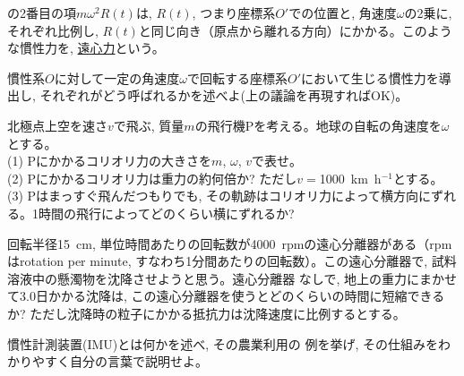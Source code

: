 の2番目の項$m\omega^2 R(t)$は, $R(t)$, つまり座標系$O'$での位置と, 角速度$\omega$の2乗に, 
それぞれ比例し, $R(t)$と同じ向き（原点から離れる方向）にかかる。このような慣性力を, 
\underline{遠心力}という。
\vspace{0.2cm}

\begin{q}\label{q:inert_frame_rot_0}
慣性系$O$に対して一定の角速度$\omega$で回転する座標系$O'$において生じる慣性力を導出し, 
それぞれがどう呼ばれるかを述べよ(上の議論を再現すればOK)。
\end{q}

\begin{q}\label{q:inert_frame_rot}
北極点上空を速さ$v$で飛ぶ, 質量$m$の飛行機Pを考える。地球の自転の角速度を$\omega$とする。\\
(1) Pにかかるコリオリ力の大きさを$m$, $\omega$, $v$で表せ。\\
(2) Pにかかるコリオリ力は重力の約何倍か? ただし$v=$1000~km~h$^{-1}$とする。\\
(3) Pはまっすぐ飛んだつもりでも, その軌跡はコリオリ力によって横方向にずれる。1時間の飛行によってどのくらい横にずれるか?
\end{q}

\begin{q}\label{q:centrifuge}
回転半径15~cm, 単位時間あたりの回転数が4000~rpmの遠心分離器がある（rpmはrotation per minute, 
すなわち1分間あたりの回転数）。この遠心分離器で, 試料溶液中の懸濁物を沈降させようと思う。遠心分離器
なしで, 地上の重力にまかせて3.0日かかる沈降は, この遠心分離器を使うとどのくらいの時間に短縮できるか?
ただし沈降時の粒子にかかる抵抗力は沈降速度に比例するとする。
\end{q}

\begin{q}\label{q:IMU} 慣性計測装置(IMU)とは何かを述べ, その農業利用の
例を挙げ, その仕組みをわかりやすく自分の言葉で説明せよ。\end{q}


